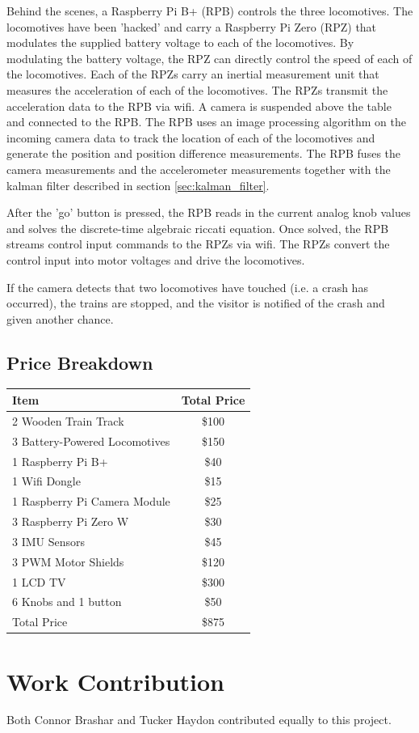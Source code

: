 \documentclass[12pt,onecolumn,reqno]{amsart}
\begin{document}
Behind the scenes, a Raspberry Pi B+ (RPB) controls the three locomotives. The
locomotives have been 'hacked' and carry a Raspberry Pi Zero (RPZ) that
modulates the supplied battery voltage to each of the locomotives. By modulating
the battery voltage, the RPZ can directly control the speed of each of the
locomotives. Each of the RPZs carry an inertial measurement unit that measures
the acceleration of each of the locomotives. The RPZs transmit the acceleration
data to the RPB via wifi. A camera is suspended above the table and connected to
the RPB. The RPB uses an image processing algorithm on the incoming camera data
to track the location of each of the locomotives and generate the position and
position difference measurements. The RPB fuses the camera measurements and the
accelerometer measurements together with the kalman filter described in section
\ref{sec:kalman_filter}.

After the 'go' button is pressed, the RPB reads in the current analog knob
values and solves the discrete-time algebraic riccati equation. Once solved, the
RPB streams control input commands to the RPZs via wifi. The RPZs convert the
control input into motor voltages and drive the locomotives. 

If the camera detects that two locomotives have touched (i.e. a crash has
occurred), the trains are stopped, and the visitor is notified of the crash and
given another chance.


\subsection{Price Breakdown}
\begin{center}
  \begin{tabular} { || l c || }
    \hline
    Item & Total Price \\ [0.5ex] 
    \hline\hline
    2 Wooden Train Track          & \$100 \\
    3 Battery-Powered Locomotives & \$150 \\
    1 Raspberry Pi B+             & \$40  \\
    1 Wifi Dongle                 & \$15  \\
    1 Raspberry Pi Camera Module  & \$25  \\
    3 Raspberry Pi Zero W         & \$30  \\
    3 IMU Sensors                 & \$45  \\
    3 PWM Motor Shields           & \$120  \\
    1 LCD TV                      & \$300 \\ 
    6 Knobs and 1 button          & \$50  \\
    \hline
    Total Price                   & \$875 \\
    \hline
  \end{tabular}
\end{center}

\section{Work Contribution}
Both Connor Brashar and Tucker Haydon contributed equally to this project.




\end{document}
